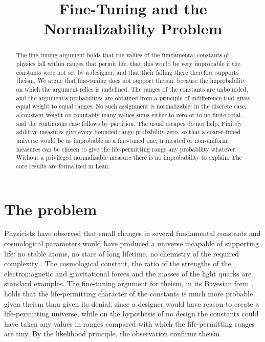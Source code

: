 \documentclass{situationist-preprint}
\title{Fine-Tuning and the Normalizability Problem}
\begin{document}
\maketitle

\begin{abstract}
The fine-tuning argument holds that the values of the fundamental constants of physics fall within ranges that permit life, that this would be very improbable if the constants were not set by a designer, and that their falling there therefore supports theism. We argue that fine-tuning does not support theism, because the improbability on which the argument relies is undefined. The ranges of the constants are unbounded, and the argument's probabilities are obtained from a principle of indifference that gives equal weight to equal ranges. No such assignment is normalizable: in the discrete case, a constant weight on countably many values sums either to zero or to no finite total, and the continuous case follows by partition. The usual escapes do not help. Finitely additive measures give every bounded range probability zero, so that a coarse-tuned universe would be as improbable as a fine-tuned one; truncated or non-uniform measures can be chosen to give the life-permitting range any probability whatever. Without a privileged normalizable measure there is no improbability to explain. The core results are formalized in Lean.
\end{abstract}

\section{The problem}

Physicists have observed that small changes in several fundamental constants and cosmological parameters would have produced a universe incapable of supporting life: no stable atoms, no stars of long lifetime, no chemistry of the required complexity \citep{Carter1974,Rees1999,Barnes2012}. The cosmological constant, the ratio of the strengths of the electromagnetic and gravitational forces and the masses of the light quarks are standard examples. The fine-tuning argument for theism, in its Bayesian form \citep{Swinburne2004,Collins2009}, holds that the life-permitting character of the constants is much more probable given theism than given its denial, since a designer would have reason to create a life-permitting universe, while on the hypothesis of no design the constants could have taken any values in ranges compared with which the life-permitting ranges are tiny. By the likelihood principle, the observation confirms theism.
\end{document}
